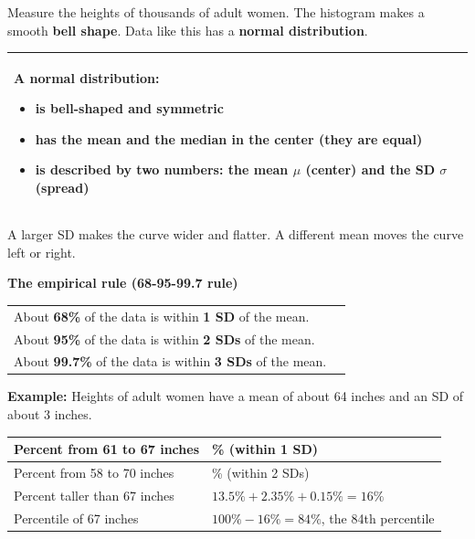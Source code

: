 \documentclass[11pt]{article}
\begin{document}

Measure the heights of thousands of adult women. The histogram makes a smooth \textbf{bell shape}.
Data like this has a \textbf{normal distribution}.

\vspace{0.4em}
\begin{tabular}{|>{\raggedright\arraybackslash}p{6.7in}|}\hline
\rule{0pt}{1.2em}\textbf{A normal distribution:}
\begin{itemize}[itemsep=0pt,topsep=2pt]
  \item is bell-shaped and symmetric
  \item has the mean and the median in the center (they are equal)
  \item is described by two numbers: the \textbf{mean} $\mu$ (center) and the \textbf{SD} $\sigma$ (spread)
\end{itemize}\vspace{-1.3em}\\ \hline
\end{tabular}

\vspace{0.3em}
A larger SD makes the curve wider and flatter. A different mean moves the curve left or right.

\vspace{0.8em}
\textbf{The empirical rule (68-95-99.7 rule)}

\begin{center}\end{center}

\begin{tabular}{@{}ll}
About \textbf{68\%} of the data is within \textbf{1 SD} of the mean.\\
About \textbf{95\%} of the data is within \textbf{2 SDs} of the mean.\\
About \textbf{99.7\%} of the data is within \textbf{3 SDs} of the mean.\\
\end{tabular}

\vspace{0.8em}
\textbf{Example:} Heights of adult women have a mean of about 64 inches and an SD of about 3 inches.

\begin{center}\end{center}

\renewcommand{\arraystretch}{1.3}
\begin{tabular}{|>{\raggedright\arraybackslash}p{2.9in}|>{\raggedright\arraybackslash}p{3.6in}|}\hline
Percent from 61 to 67 inches & 68\% (within 1 SD)\\ \hline
Percent from 58 to 70 inches & 95\% (within 2 SDs)\\ \hline
Percent taller than 67 inches & $13.5\% + 2.35\% + 0.15\% = 16\%$\\ \hline
Percentile of 67 inches & $100\% - 16\% = 84\%$, the 84th percentile\\ \hline
\end{tabular}
\end{document}
